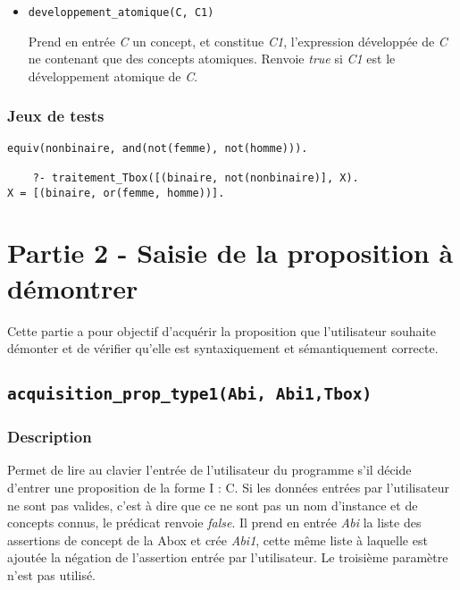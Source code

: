 \documentclass{article}
\newcommand{\code}[1]{\colorbox{light-gray}{\texttt{#1}}}
\begin{document}
\begin{itemize}    
    \item \code{developpement\_atomique(C, C1)}

    Prend en entrée \textit{C} un concept, et constitue \textit{C1}, l'expression développée de \textit{C} ne contenant que des concepts atomiques. Renvoie \textit{true} si \textit{C1} est le développement atomique de \textit{C}.
    
\end{itemize}

\subsubsection{Jeux de tests}

\begin{verbatim}
equiv(nonbinaire, and(not(femme), not(homme))).

    ?- traitement_Tbox([(binaire, not(nonbinaire)], X).
X = [(binaire, or(femme, homme))].
\end{verbatim}

\clearpage

\section{Partie 2 - Saisie de la proposition à démontrer}

Cette partie a pour objectif d'acquérir la proposition que l'utilisateur souhaite démonter et de vérifier qu'elle est syntaxiquement et sémantiquement correcte.

\subsection{\code{acquisition\_prop\_type1(Abi, Abi1,Tbox)}}
\subsubsection{Description}

Permet de lire au clavier l'entrée de l'utilisateur du programme s'il décide d'entrer une proposition de la forme I : C. Si les données entrées par l'utilisateur ne sont pas valides, c'est à dire que ce ne sont pas un nom d'instance et de concepts connus, le prédicat renvoie \textit{false}. Il prend en entrée \textit{Abi} la liste des assertions de concept de la Abox et crée \textit{Abi1}, cette même liste à laquelle est ajoutée la négation de l'assertion entrée par l'utilisateur. Le troisième paramètre n'est pas utilisé. 
\end{document}
